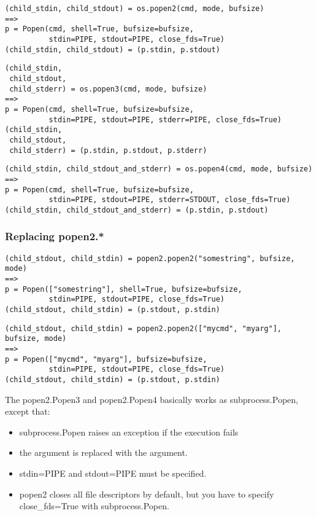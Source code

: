 \begin{verbatim}
(child_stdin, child_stdout) = os.popen2(cmd, mode, bufsize)
==>
p = Popen(cmd, shell=True, bufsize=bufsize,
          stdin=PIPE, stdout=PIPE, close_fds=True)
(child_stdin, child_stdout) = (p.stdin, p.stdout)
\end{verbatim}

\begin{verbatim}
(child_stdin,
 child_stdout,
 child_stderr) = os.popen3(cmd, mode, bufsize)
==>
p = Popen(cmd, shell=True, bufsize=bufsize,
          stdin=PIPE, stdout=PIPE, stderr=PIPE, close_fds=True)
(child_stdin,
 child_stdout,
 child_stderr) = (p.stdin, p.stdout, p.stderr)
\end{verbatim}

\begin{verbatim}
(child_stdin, child_stdout_and_stderr) = os.popen4(cmd, mode, bufsize)
==>
p = Popen(cmd, shell=True, bufsize=bufsize,
          stdin=PIPE, stdout=PIPE, stderr=STDOUT, close_fds=True)
(child_stdin, child_stdout_and_stderr) = (p.stdin, p.stdout)
\end{verbatim}

\subsubsection{Replacing popen2.*}


\begin{verbatim}
(child_stdout, child_stdin) = popen2.popen2("somestring", bufsize, mode)
==>
p = Popen(["somestring"], shell=True, bufsize=bufsize,
          stdin=PIPE, stdout=PIPE, close_fds=True)
(child_stdout, child_stdin) = (p.stdout, p.stdin)
\end{verbatim}

\begin{verbatim}
(child_stdout, child_stdin) = popen2.popen2(["mycmd", "myarg"], bufsize, mode)
==>
p = Popen(["mycmd", "myarg"], bufsize=bufsize,
          stdin=PIPE, stdout=PIPE, close_fds=True)
(child_stdout, child_stdin) = (p.stdout, p.stdin)
\end{verbatim}

The popen2.Popen3 and popen2.Popen4 basically works as subprocess.Popen,
except that:

\begin{itemize}
\item subprocess.Popen raises an exception if the execution fails

\item the  argument is replaced with the 
      argument.

\item stdin=PIPE and stdout=PIPE must be specified.

\item popen2 closes all file descriptors by default, but you have to
      specify close_fds=True with subprocess.Popen.
\end{itemize}
